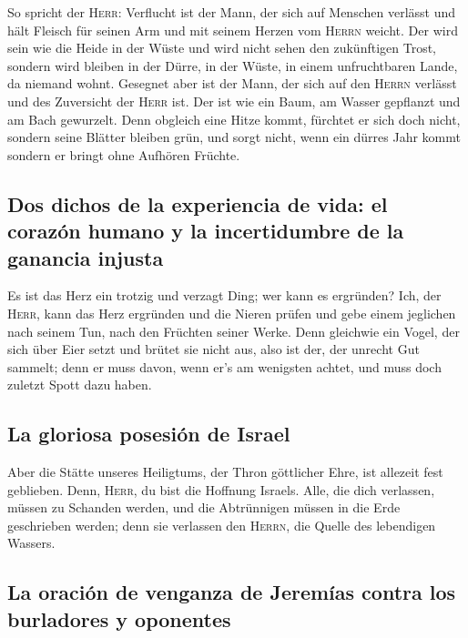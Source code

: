  So spricht der \textsc{Herr}: Verflucht ist der Mann, der
sich auf Menschen verlässt und hält Fleisch für seinen Arm und mit
seinem Herzen vom \textsc{Herrn} weicht.  Der wird sein
wie die Heide in der Wüste und wird nicht sehen den zukünftigen Trost,
sondern wird bleiben in der Dürre, in der Wüste, in einem unfruchtbaren
Lande, da niemand wohnt.  Gesegnet aber ist der Mann, der
sich auf den \textsc{Herrn} verlässt und des Zuversicht der
\textsc{Herr} ist.  Der ist wie ein Baum, am Wasser
gepflanzt und am Bach gewurzelt. Denn obgleich eine Hitze kommt,
fürchtet er sich doch nicht, sondern seine Blätter bleiben grün, und
sorgt nicht, wenn ein dürres Jahr kommt sondern er bringt ohne Aufhören
Früchte.

\hypertarget{dos-dichos-de-la-experiencia-de-vida-el-corazuxf3n-humano-y-la-incertidumbre-de-la-ganancia-injusta}{%
\subsection{Dos dichos de la experiencia de vida: el corazón humano y la
incertidumbre de la ganancia
injusta}\label{dos-dichos-de-la-experiencia-de-vida-el-corazuxf3n-humano-y-la-incertidumbre-de-la-ganancia-injusta}}

 Es ist das Herz ein trotzig und verzagt Ding; wer kann es
ergründen?  Ich, der \textsc{Herr}, kann das Herz
ergründen und die Nieren prüfen und gebe einem jeglichen nach seinem
Tun, nach den Früchten seiner Werke.  Denn gleichwie ein
Vogel, der sich über Eier setzt und brütet sie nicht aus, also ist der,
der unrecht Gut sammelt; denn er muss davon, wenn er's am wenigsten
achtet, und muss doch zuletzt Spott dazu haben.

\hypertarget{la-gloriosa-posesiuxf3n-de-israel}{%
\subsection{La gloriosa posesión de
Israel}\label{la-gloriosa-posesiuxf3n-de-israel}}

 Aber die Stätte unseres Heiligtums, der Thron göttlicher
Ehre, ist allezeit fest geblieben.  Denn, \textsc{Herr},
du bist die Hoffnung Israels. Alle, die dich verlassen, müssen zu
Schanden werden, und die Abtrünnigen müssen in die Erde geschrieben
werden; denn sie verlassen den \textsc{Herrn}, die Quelle des lebendigen
Wassers.

\hypertarget{la-oraciuxf3n-de-venganza-de-jeremuxedas-contra-los-burladores-y-oponentes}{%
\subsection{La oración de venganza de Jeremías contra los burladores y
oponentes}\label{la-oraciuxf3n-de-venganza-de-jeremuxedas-contra-los-burladores-y-oponentes}}

